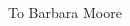 \cleardoublepage
\thispagestyle{empty} %

\vspace*{8cm} 

\hfill
\begin{parbox}{0.6\textwidth}{
	\begin{flushright}
		To Barbara Moore
	\end{flushright}}
\end{parbox}